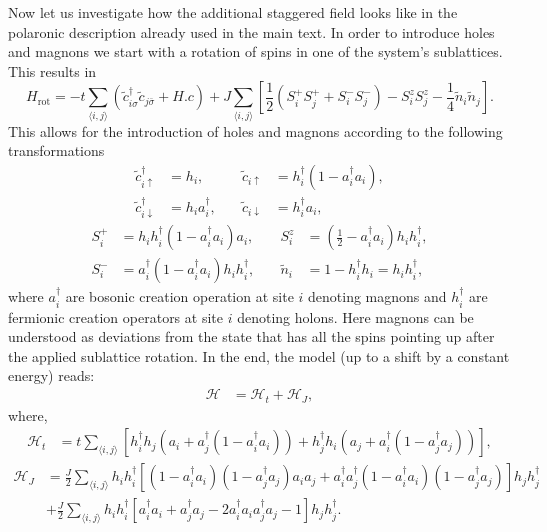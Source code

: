 \documentclass[%
 reprint,
 amsmath,amssymb,
 aps, onecolumn,
prl,
]{revtex4-1}
\newcommand{\mean}[1]{\langle#1\rangle}
\begin{document}
Now let us investigate how the additional staggered field looks like in the polaronic description already used in the main text. In order to introduce holes and magnons we start with a rotation of spins in one of the system's sublattices. This results in
%
\begin{equation}
	H_{\text{rot}} = -t\sum_{\mean{i,j}}\left(\tilde{c}_{i\sigma}^\dagger\tilde{c}_{j\bar{\sigma}} + H.c\right)
	+ J\sum_{\mean{i,j}}\left[\frac{1}{2}\left(S_i^+S_j^+ + S_i^-S_j^-\right) - S_i^zS_j^z - \frac{1}{4}\tilde{n}_i\tilde{n}_j\right].
\end{equation}
%
This allows for the introduction of holes and magnons according to the following transformations
%
\begin{equation}
	\begin{aligned}
	\tilde{c}_{i\uparrow}^\dag &= h_i, &\quad \tilde{c}_{i\uparrow} &= h_i^\dag (1 - a_i^\dag a_i), \\
	\tilde{c}_{i\downarrow}^\dag &= h_i a_i^\dag, &\quad \tilde{c}_{i\downarrow} &= h_i^\dag a_i,
	\end{aligned}
\end{equation}
%
\begin{equation}
	\begin{aligned}
		S_i^+ &= h_i h_i^\dag (1 - a_i^\dag a_i)a_i, &\quad S_i^z &= \left(\frac{1}{2} - a_i^\dag a_i \right) h_i h_i^\dag, \\
		S_i^- &= a_i^\dag (1 - a_i^\dag a_i) h_i h_i^\dag, &\quad \tilde{n}_i &= 1 - h_i^\dag h_i = h_i h_i^\dag,
	\end{aligned}
\end{equation}
where $a_i^\dag$ are bosonic creation operation at site $i$ denoting magnons and $h_i^\dag$ are fermionic creation operators at site $i$ denoting holons.
Here magnons can be understood as deviations from the state that has all the spins pointing up after the applied sublattice rotation. In the end, the model (up to a shift by a constant energy) reads:
%
\begin{align}
	\mathcal{H} &= \mathcal{H}_{t} + \mathcal{H}_{J},
\end{align}
%
where,
%	
\begin{equation}
	\begin{split}
	\mathcal{H}_{t} &= t \sum_{\mean{i,j}} \left[h_i^\dag h_j \left( a_i + a_j^\dag (1 -  a_i^\dag a_i) \right) + h_j^\dag h_i \left( a_j + a_i^\dag (1 -  a_j^\dag a_j) \right)\right],
	\end{split}
	\label{eq:ht}
\end{equation}
%
\begin{equation}
	\begin{aligned}
	\mathcal{H}_{J} &= \frac{J}{2}\sum_{\mean{i,j}} h_i h_i^\dag \left[(1 - a_i^\dag a_i)(1 - a_j^\dag a_j)a_i a_j + a_i^\dag a_j^\dag (1 - a_i^\dag a_i)(1 - a_j^\dag a_j) \right] h_j h_j^\dag \\
	&+ \frac{J}{2} \sum_{\mean{i,j}} h_i h_i^\dag \left[a_i^\dag a_i + a_j^\dag a_j - 2 a_i^\dag a_i a_j^\dag a_j - 1\right] h_j h_j^\dag.
	\end{aligned}
	\label{eq:hj}
\end{equation}
\end{document}

